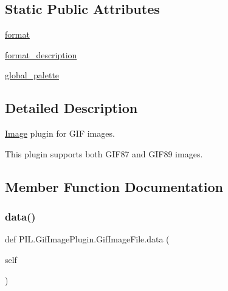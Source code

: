 \subsection*{Static Public Attributes}
\begin{DoxyCompactItemize}
\item 
\hyperlink{classPIL_1_1GifImagePlugin_1_1GifImageFile_a81083fd8dd20a294bb3d0da783e8421e}{format}
\item 
\hyperlink{classPIL_1_1GifImagePlugin_1_1GifImageFile_a56cc579005f8f41ed5d6bef58b65a857}{format\+\_\+description}
\item 
\hyperlink{classPIL_1_1GifImagePlugin_1_1GifImageFile_adfb3c3e176ba9a8fdecc804a2170024c}{global\+\_\+palette}
\end{DoxyCompactItemize}


\subsection{Detailed Description}
\hyperlink{namespacePIL_1_1Image}{Image} plugin for G\+IF images. 

This plugin supports both G\+I\+F87 and G\+I\+F89 images. 

\subsection{Member Function Documentation}
\mbox{\label{classPIL_1_1GifImagePlugin_1_1GifImageFile_a37575432ca65b572fd988a4803bc4d9d}} 
\subsubsection{\texorpdfstring{data()}{data()}}
{\footnotesize\ttfamily def P\+I\+L.\+Gif\+Image\+Plugin.\+Gif\+Image\+File.\+data (\begin{DoxyParamCaption}\item[{}]{self }\end{DoxyParamCaption})}

\mbox{\label{classPIL_1_1GifImagePlugin_1_1GifImageFile_a99495da3893f68aee2eeb1cc7a059b4b}} 
